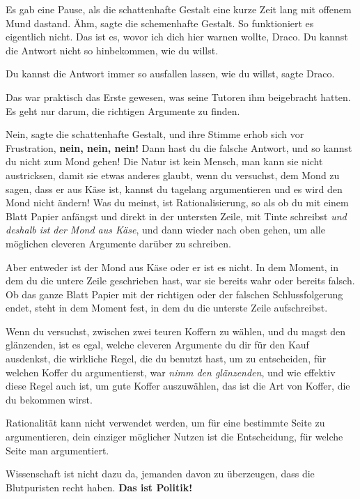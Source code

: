 Es gab eine Pause, als die schattenhafte Gestalt eine kurze Zeit lang mit
offenem Mund dastand. \glqq{}Ähm\grqq{}, sagte die schemenhafte Gestalt. \glqq{}So
funktioniert es eigentlich nicht. Das ist es, wovor ich dich hier warnen wollte,
Draco. Du kannst die Antwort nicht so hinbekommen, wie du willst.\grqq{}

\glqq{}Du kannst die Antwort immer so ausfallen lassen, wie du willst\grqq{},
sagte Draco.

Das war praktisch das Erste gewesen, was seine Tutoren ihm beigebracht hatten.
\glqq{}Es geht nur darum, die richtigen Argumente zu finden.\grqq{}

\glqq{}Nein\grqq{}, sagte die schattenhafte Gestalt, und ihre Stimme erhob sich
vor Frustration, \glqq{}\textbf{nein, nein, nein!} Dann hast du die falsche
Antwort, und so kannst du nicht zum Mond gehen! Die Natur ist kein Mensch, man
kann sie nicht austricksen, damit sie etwas anderes glaubt, wenn du versuchst,
dem Mond zu sagen, dass er aus Käse ist, kannst du tagelang argumentieren und es
wird den Mond nicht ändern! Was du meinst, ist Rationalisierung, so als ob du
mit einem Blatt Papier anfängst und direkt in der untersten Zeile, mit Tinte
schreibst \emph{\glqq{}und deshalb ist der Mond aus Käse\grqq{}}, und dann wieder
nach oben gehen, um alle möglichen cleveren Argumente darüber zu schreiben.

Aber entweder ist der Mond aus Käse oder er ist es nicht. In dem Moment, in dem
du die untere Zeile geschrieben hast, war sie bereits wahr oder bereits falsch.
Ob das ganze Blatt Papier mit der richtigen oder der falschen Schlussfolgerung
endet, steht in dem Moment fest, in dem du die unterste Zeile aufschreibst.

Wenn du versuchst, zwischen zwei teuren Koffern zu wählen, und du magst den
glänzenden, ist es egal, welche cleveren Argumente du dir für den Kauf
ausdenkst, die wirkliche Regel, die du benutzt hast, um zu entscheiden, für
welchen Koffer du argumentierst, war \emph{\glqq{}nimm den glänzenden\grqq{}},
und wie effektiv diese Regel auch ist, um gute Koffer auszuwählen, das ist die
Art von Koffer, die du bekommen wirst.

Rationalität kann nicht verwendet werden, um für eine bestimmte Seite zu
argumentieren, dein einziger möglicher Nutzen ist die Entscheidung, für welche
Seite man argumentiert.

Wissenschaft ist nicht dazu da, jemanden davon zu überzeugen, dass die
Blutpuristen recht haben. \textbf{Das ist Politik!}

